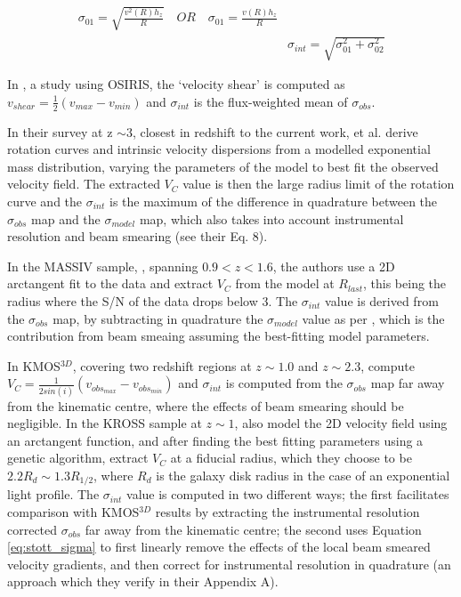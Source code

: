 \documentclass[fleqn,usenatbib]{mn2e}
\begin{document}
\begin{equation}\label{eq:sins_sigma}
\begin{split}
\sigma_{01} = \sqrt{\frac{v^{2}(R)h_{z}}{R}} \quad OR \quad \sigma_{01} = \frac{v(R)h_{z}}{R} \\
& \sigma_{int} = \sqrt{\sigma_{01}^{2} + \sigma_{02}^{2}}
\end{split}
\end{equation}

In \cite{Law2009}, a study using OSIRIS, the `velocity shear' is computed as $v_{shear} = \frac{1}{2}(v_{max} - v_{min})$ and $\sigma_{int}$ is the flux-weighted mean of $\sigma_{obs}$.

In their survey at z $\sim 3$, closest in redshift to the current work, \cite{Gnerucci2011} et al. derive rotation curves and intrinsic velocity dispersions from a modelled exponential mass distribution, varying the parameters of the model to best fit the observed velocity field.
The extracted $V_{C}$ value is then the large radius limit of the rotation curve and the $\sigma_{int}$ is the maximum of the difference in quadrature between the $\sigma_{obs}$ map and the $\sigma_{model}$ map, which also takes into account instrumental resolution and beam smearing (see their Eq. 8).

In the MASSIV sample, \citep{Epinat2012}, spanning $0.9 < z < 1.6$, the authors use a 2D arctangent fit to the data and extract $V_{C}$ from the model at $R_{last}$, this being the radius where the S/N of the data drops below 3.
The $\sigma_{int}$ value is derived from the $\sigma_{obs}$ map, by subtracting in quadrature the $\sigma_{model}$ value as per \cite{Epinat2010}, which is the contribution from beam smeaing assuming the best-fitting model parameters. 

In KMOS$^{3D}$, covering two redshift regions at $z \sim 1.0$ and $z \sim 2.3$, \cite{Wisnioski2015} compute $V_{C} = \frac{1}{2sin(i)}(v_{obs_{max}} - v_{obs_{min}})$ and $\sigma_{int}$ is computed from the $\sigma_{obs}$ map far away from the kinematic centre, where the effects of beam smearing should be negligible.
In the KROSS sample at $z \sim 1$, \cite{Stott2016} also model the 2D velocity field using an arctangent function, and after finding the best fitting parameters using a genetic algorithm, extract $V_{C}$ at a fiducial radius, which they choose to be $2.2R_{d} \sim 1.3R_{1/2}$, where $R_{d}$ is the galaxy disk radius in the case of an exponential light profile.
The $\sigma_{int}$ value is computed in two different ways; the first facilitates comparison with KMOS$^{3D}$ results by extracting the instrumental resolution corrected $\sigma_{obs}$ far away from the kinematic centre; the second uses Equation \ref{eq:stott_sigma} to first linearly remove the effects of the local beam smeared velocity gradients, and then correct for instrumental resolution in quadrature (an approach which they verify in their Appendix A).
\end{document}
